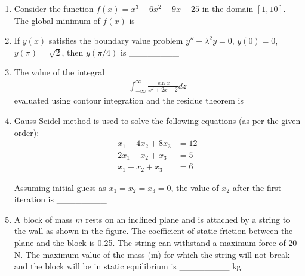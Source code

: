 \documentclass[journal,11pt,onecolumn]{IEEEtran}
\begin{document}
\begin{enumerate}[resume]

    \item Consider the function $f(x) = x^3 - 6x^2 + 9x + 25$ in the domain $[1, 10]$. The global minimum of $f(x)$ is \_\_\_\_\_\_\_\_

    \item If $y(x)$ satisfies the boundary value problem $y'' + \lambda^2 y = 0$, $y(0) = 0$, $y(\pi) = \sqrt{2}$, then $y(\pi/4)$ is \_\_\_\_\_\_\_\_

    \item The value of the integral
          \begin{align}
              \int_{-\infty}^{\infty} \frac{\sin x}{x^2 + 2x + 2} dz
          \end{align}
          evaluated using contour integration and the residue theorem is

          \begin{enumerate}


          \end{enumerate}

    \item Gauss-Seidel method is used to solve the following equations (as per the given order):
          \begin{align}
              x_1 + 4x_2 + 8x_3 & = 12 \\
              2x_1 + x_2 + x_3  & = 5  \\
              x_1 + x_2 + x_3   & = 6
          \end{align}

          Assuming initial guess as $x_1 = x_2 = x_3 = 0$, the value of $x_2$ after the first iteration is \_\_\_\_\_\_\_\_

    \item A block of mass $m$ rests on an inclined plane and is attached by a string to the wall as shown in the figure. The coefficient of static friction between the plane and the block is 0.25. The string can withstand a maximum force of 20 N. The maximum value of the mass (m) for which the string will not break and the block will be in static equilibrium is \_\_\_\_\_\_\_\_ kg.


\end{enumerate}
\end{document}
